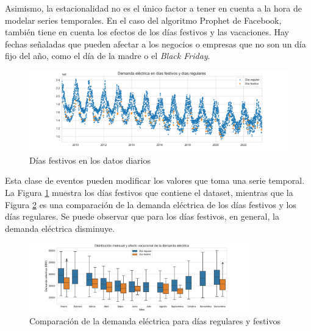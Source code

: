\documentclass[12pt,twoside]{article}
\begin{document}
Asimismo, la estacionalidad no es el único factor a tener en cuenta a la hora de modelar series temporales. En el caso del algoritmo Prophet de Facebook, también tiene en cuenta los efectos de los días festivos y las vacaciones. Hay fechas señaladas que pueden afectar a los negocios o empresas que no son un día fijo del año, como el día de la madre o el \emph{Black Friday}. 
\begin{figure}[h]
\centering
    \includegraphics[width = \textwidth]{imagenes/hday.png}
    \caption{Días festivos en los datos diarios}\label{fig:hday}
\end{figure}

Esta clase de eventos pueden modificar los valores que toma una serie temporal. La Figura \ref{fig:hday} muestra los días festivos que contiene el dataset, mientras que la Figura \ref{fig:monthplot} es una comparación de la demanda eléctrica de los días festivos y los días regulares. Se puede observar que para los días festivos, en general, la demanda eléctrica disminuye.
\begin{figure}[h]
\centering
    \includegraphics[width = 0.85\textwidth]{imagenes/monthplot.png}
    \caption{Comparación de la demanda eléctrica para días regulares y festivos}\label{fig:monthplot}
\end{figure}
\end{document}

